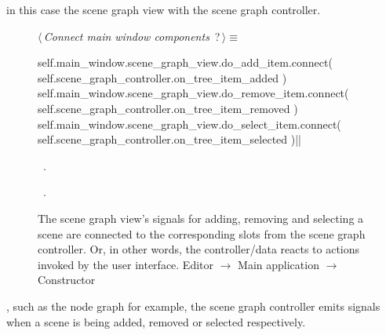 \documentclass[%
    a4paper,    %
    justified,  %
    nobib,      %
    openany     %
]{tufte-book}
\makeatletter
\renewcommand{\label}[1]{\@tufte@label{##1}}%
\makeatother
\begin{document}
 in
this case the scene graph view with the scene graph controller.

\begin{figure}
\begin{flushleft} \small
\begin{minipage}{\linewidth}\label{scrap53}\raggedright\small
{} $\langle\,${\itshape Connect main window components}\nobreak\ {\footnotesize {?}}$\,\rangle\equiv$
\vspace{-1ex}
\begin{pythoncode}
self.main_window.scene_graph_view.do_add_item.connect(
    self.scene_graph_controller.on_tree_item_added
)
self.main_window.scene_graph_view.do_remove_item.connect(
    self.scene_graph_controller.on_tree_item_removed
)
self.main_window.scene_graph_view.do_select_item.connect(
    self.scene_graph_controller.on_tree_item_selected
)|\NWsep|
\end{pythoncode}
\vspace{1.5ex}
\footnotesize
\begin{list}{}{\setlength{\itemsep}{-\parsep}\setlength{\itemindent}{-\leftmargin}}
\item \NWtxtMacroDefBy\ .
\item \NWtxtMacroRefIn\ .

\item{}
\end{list}
\end{minipage}\vspace{4ex}
\end{flushleft}
\caption{The scene graph view's signals for adding, removing and selecting a
  scene are connected to the corresponding slots from the scene graph
  controller. Or, in other words, the controller/data reacts to actions invoked
  by the user interface.
  \newline{}\newline{}Editor $\rightarrow$ Main application
  $\rightarrow$ Constructor}
\label{editor:lst:main-application:constructor:connect-scene-graph-view}
\end{figure}

, such as the node
graph for example, the scene graph controller emits signals when a scene is
being added, removed or selected respectively.
\end{document}
